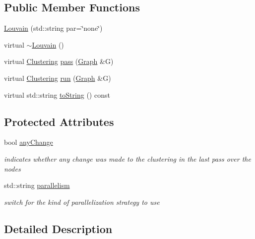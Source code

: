 \subsection*{Public Member Functions}
\begin{DoxyCompactItemize}
\item 
\hyperlink{class_networ_kit_1_1_louvain_a5ddbd33d58a2a7f4be92429149cec17f}{Louvain} (std\-::string par=\char`\"{}none\char`\"{})
\item 
virtual \hyperlink{class_networ_kit_1_1_louvain_a31031bd1cab70940668a08ea7da75a20}{$\sim$\-Louvain} ()
\item 
virtual \hyperlink{class_networ_kit_1_1_clustering}{Clustering} \hyperlink{class_networ_kit_1_1_louvain_a40251120e85c77c17e53713435653fe7}{pass} (\hyperlink{class_networ_kit_1_1_graph}{Graph} \&G)
\item 
virtual \hyperlink{class_networ_kit_1_1_clustering}{Clustering} \hyperlink{class_networ_kit_1_1_louvain_a493a2aba661d7c4dec2b573f963f800d}{run} (\hyperlink{class_networ_kit_1_1_graph}{Graph} \&G)
\item 
virtual std\-::string \hyperlink{class_networ_kit_1_1_louvain_a6c7b4f56e6aea10e481f7fe7e91b43b8}{to\-String} () const 
\end{DoxyCompactItemize}
\subsection*{Protected Attributes}
\begin{DoxyCompactItemize}
\item 
bool \hyperlink{class_networ_kit_1_1_louvain_a2531d4e703305b7a4b6ea1ca67450a0d}{any\-Change}
\begin{DoxyCompactList}\small\item\em indicates whether any change was made to the clustering in the last pass over the nodes \end{DoxyCompactList}\item 
std\-::string \hyperlink{class_networ_kit_1_1_louvain_ad690b266426199e76caefd234ea53397}{parallelism}
\begin{DoxyCompactList}\small\item\em switch for the kind of parallelization strategy to use \end{DoxyCompactList}\end{DoxyCompactItemize}


\subsection{Detailed Description}


